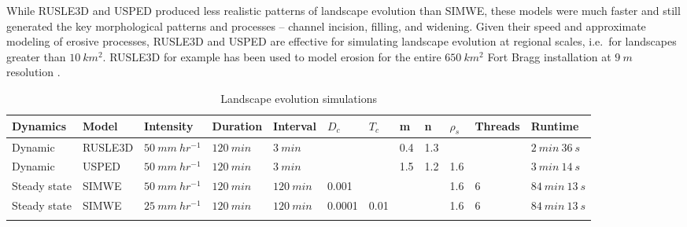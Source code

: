 \documentclass[esurf, manuscript]{copernicus}
\begin{document}
While RUSLE3D and USPED
produced less realistic patterns of landscape evolution
than SIMWE,
these models were much faster and still generated
the key morphological patterns and processes -- 
channel incision, filling, and widening. 
%
Given their speed
and approximate modeling of erosive processes, 
RUSLE3D and USPED 
are effective for simulating landscape evolution
at regional scales, 
i.e.~for landscapes greater than $10~km^{2}$. 
%
RUSLE3D for example has been used to
model erosion for the entire $650~km^{2}$ 
Fort Bragg installation at $9~m$ resolution
\citep{Levine2018}. 


\begin{table}
\small
\caption{Landscape evolution simulations}
\begin{tabu} to \textwidth {XXXXXllllllX}
\toprule
Dynamics & Model & Intensity & Duration & Interval & $D_c$ & $T_c$ & m & n & $\rho_s$ & Threads & Runtime\\
\midrule
Dynamic & RUSLE3D & $50~mm~hr^{-1}$ & $120~min$ & $3~min$ &  &  & 0.4 & 1.3 & & & $2~min~36~s$\\
Dynamic & USPED & $50~mm~hr^{-1}$ & $120~min$ & $3~min$ &  &  & 1.5 & 1.2 & 1.6 & & $3~min~14~s$\\
Steady state & SIMWE & $50~mm~hr^{-1}$ & $120~min$ & $120~min$ & 0.001 & & & & 1.6 & 6 & $84~min~13~s$\\
Steady state & SIMWE & $25~mm~hr^{-1}$ & $120~min$ & $120~min$ & 0.0001 & 0.01 & & & 1.6 & 6 & $84~min~13~s$\\
\bottomrule
\\
\end{tabu}
\label{table:simulations} 
\end{table}

\end{document}
